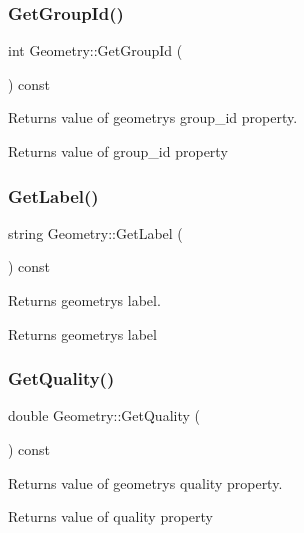 \subsubsection{\texorpdfstring{Get\+Group\+Id()}{GetGroupId()}}
{\footnotesize\ttfamily int Geometry\+::\+Get\+Group\+Id (\begin{DoxyParamCaption}{ }\end{DoxyParamCaption}) const}

Returns value of geometry\textquotesingle{}s group\+\_\+id property. \begin{DoxyReturn}{Returns}
value of group\+\_\+id property 
\end{DoxyReturn}
\hypertarget{class_geometry_a790bc03456ac9c225a004ebfb9279487}{}\label{class_geometry_a790bc03456ac9c225a004ebfb9279487} 
\subsubsection{\texorpdfstring{Get\+Label()}{GetLabel()}}
{\footnotesize\ttfamily string Geometry\+::\+Get\+Label (\begin{DoxyParamCaption}{ }\end{DoxyParamCaption}) const}

Returns geometry\textquotesingle{}s label. \begin{DoxyReturn}{Returns}
geometry\textquotesingle{}s label 
\end{DoxyReturn}
\hypertarget{class_geometry_a1133070c22222662eb75f92a0dcf1843}{}\label{class_geometry_a1133070c22222662eb75f92a0dcf1843} 
\subsubsection{\texorpdfstring{Get\+Quality()}{GetQuality()}}
{\footnotesize\ttfamily double Geometry\+::\+Get\+Quality (\begin{DoxyParamCaption}{ }\end{DoxyParamCaption}) const}

Returns value of geometry\textquotesingle{}s quality property. \begin{DoxyReturn}{Returns}
value of quality property 
\end{DoxyReturn}
\hypertarget{class_geometry_a311538e128f84a532d1a63d44843f33d}{}\label{class_geometry_a311538e128f84a532d1a63d44843f33d} 
